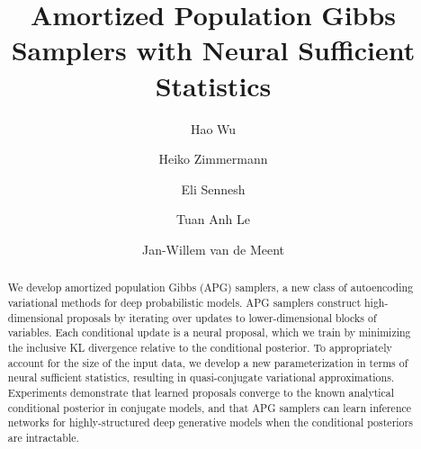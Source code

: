\documentclass[anonymous=false, %
               format=acmsmall, %
               review=true, %
               screen=true, %
               nonacm=true]{acmart}
\theoremstyle{definition}
\begin{document}
\title{Amortized Population Gibbs Samplers with Neural Sufficient Statistics}

\author{Hao Wu}

\author{Heiko Zimmermann}

\author{Eli Sennesh}

\author{Tuan Anh Le}

\author{Jan-Willem van de Meent}

\begin{abstract}
We develop amortized population Gibbs (APG) samplers, a new class of autoencoding variational methods for deep probabilistic models. APG samplers construct high-dimensional proposals by iterating over updates to lower-dimensional blocks of variables. Each conditional update is a neural proposal, which we train by minimizing the inclusive KL divergence relative to the conditional posterior. To appropriately account for the size of the input data, we develop a new parameterization in terms of neural sufficient statistics, resulting in quasi-conjugate variational approximations. Experiments demonstrate that learned proposals converge to the known analytical conditional posterior in conjugate models, and that APG samplers can learn inference networks for highly-structured deep generative models when the conditional posteriors are intractable. 
\end{abstract}
\end{document}
